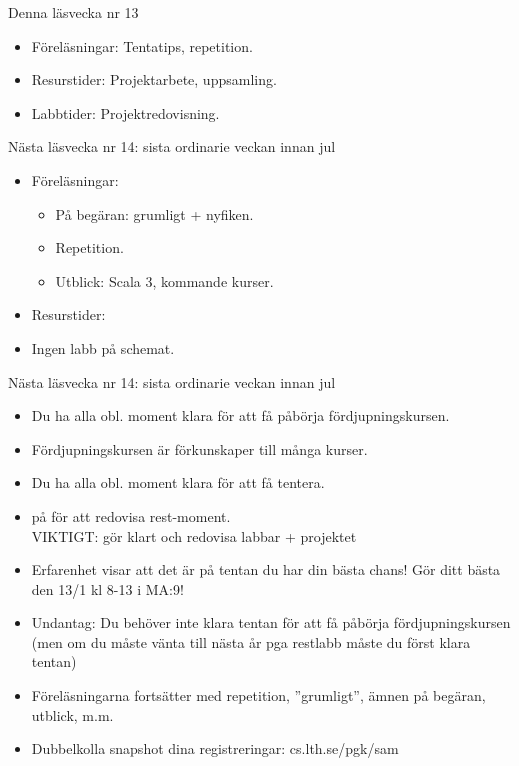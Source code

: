 
\ifkompendium\else
\begin{Slide}{Denna läsvecka nr 13}
    \begin{itemize}
        \item Föreläsningar: Tentatips, repetition.
        \item Resurstider: Projektarbete, uppsamling.
        \item Labbtider: Projektredovisning.
    \end{itemize}
\end{Slide}


\begin{Slide}{Nästa läsvecka nr 14: sista ordinarie veckan innan jul}
    \begin{itemize}
        \item Föreläsningar: 
        \begin{itemize}
            \item På begäran: grumligt + nyfiken. 
            \item Repetition.
            \item Utblick: Scala 3, kommande kurser.
        \end{itemize}
        \item Resurstider: 
        \item Ingen labb på schemat.
    \end{itemize}
\end{Slide}

\begin{Slide}{Nästa läsvecka nr 14: sista ordinarie veckan innan jul}

  \begin{itemize}
    \item Du  ha alla obl. moment klara för att få påbörja fördjupningskursen.
    \item Fördjupningskursen är förkunskaper till många kurser.
    \item Du  ha alla obl. moment klara för att få tentera. 
    \item {} på  för att redovisa rest-moment. \\ VIKTIGT: gör klart och redovisa  labbar + projektet

    \item Erfarenhet visar att det är på   tentan du har din bästa chans! Gör ditt bästa den 13/1 kl 8-13 i MA:9!
    

    \item Undantag: Du behöver inte klara tentan för att få påbörja fördjupningskursen  (men om du måste vänta till nästa år pga restlabb måste du först klara tentan)


    \item Föreläsningarna fortsätter med repetition, ''grumligt'', ämnen på begäran, utblick, m.m.
    \item Dubbelkolla snapshot dina registreringar: cs.lth.se/pgk/sam
  \end{itemize}

\end{Slide}

